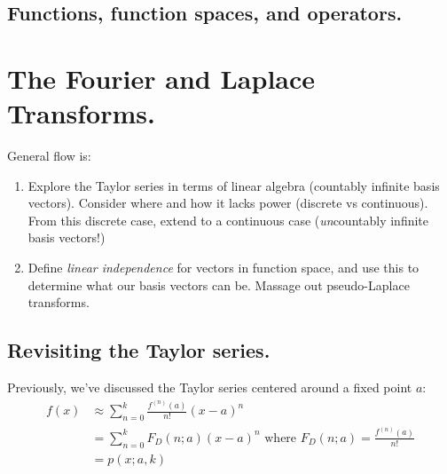 \documentclass[letterpaper,12pt]{report}
\begin{document}

\subsection{Functions, function spaces, and operators.}






\section{The Fourier and Laplace Transforms.}








General flow is:

\begin{enumerate}
  \item
    Explore the Taylor series in terms of linear algebra (countably infinite basis vectors).
    Consider where and how it lacks power (discrete vs continuous).
    From this discrete case, extend to a continuous case
    (\emph{un}countably infinite basis vectors!)
  \item
    Define \emph{linear independence} for vectors in function space, 
    and use this to determine what our basis vectors can be.
    Massage out pseudo-Laplace transforms.

\end{enumerate}

\subsection{Revisiting the Taylor series.}

Previously, we've discussed the Taylor series centered around a fixed point \(a\):
\begin{equation}
\begin{split}
  f(x) &\approx \sum_{n=0}^{k}\frac{f^{(n)}(a)}{n!}(x-a)^n  \\
       &= \sum_{n=0}^{k}F_D(n; a) (x-a)^n \text{ where } F_D(n;a) = \frac{f^{(n)}(a)}{n!} \\
       &= p(x;a,k)
\end{split}
\end{equation}\label{equation:taylor-series}
\end{document}
